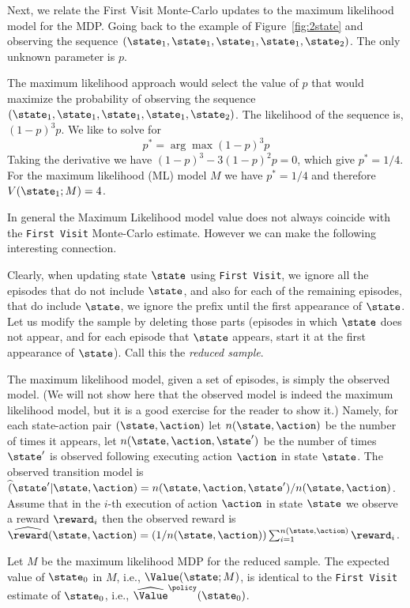 Next, we relate the First Visit Monte-Carlo updates to the maximum
likelihood model for the MDP. Going back to the example of
Figure~\ref{fig:2state} and observing the sequence
$(\state_1,\state_1,\state_1,\state_1,\state_2)$. The only unknown
parameter is $p$.

The maximum likelihood approach would select the value of $p$ that
would maximize the probability of observing the sequence
$(\state_1,\state_1,\state_1,\state_1,\state_2)$. The likelihood of
the sequence is, $(1-p)^3p$. We like to solve for
\[
p^* = \arg\max (1-p)^3 p
\]
Taking the derivative we have $(1-p)^3-3(1-p)^2p=0$, which give
$p^*=1/4$.
%
For the maximum likelihood (ML) model $M$ we have $p^*=1/4$ and
therefore $V(\state_1;M)=4$.

In general the Maximum Likelihood model value does not always
coincide with the {\tt First Visit} Monte-Carlo estimate. However we
can make the following interesting connection.

Clearly, when updating state $\state$ using {\tt First Visit}, we
ignore all the episodes that do not include $\state$, and also for
each of the remaining episodes, that do include $\state$, we ignore the
prefix until the first appearance of $\state$. Let us modify the
sample by deleting those parts (episodes in which $\state$ does not
appear, and for each episode that $\state$ appears, start it at the
first appearance of $\state$). Call this the {\em reduced sample}.

The maximum likelihood model, given a set of episodes, is simply the
observed model. (We will not show here that the observed model is
indeed the maximum likelihood model, but it is a good exercise for the reader to show it.) 
Namely, for each state-action
pair $(\state,\action)$ let $n(\state,\action)$ be the number of
times it appears, let $n(\state,\action,\state')$ be the number of
times $\state'$ is observed following executing action $\action$ in
state $\state$. The observed transition model is
$\widehat(\state'|\state,\action)=n(\state,\action,\state')/n(\state,\action)$.
Assume that in the $i$-th execution of action $\action$ in state
$\state$ we observe a reward $\reward_i$ then the observed reward is
$\widehat{\reward}(\state,\action)=(1/n(\state,\action))\sum_{i=1}^{n(\state,\action)}
\reward_i$.

\begin{theorem}
\label{thm:MC-ML}
%
Let $M$ be the maximum likelihood MDP for the reduced sample. The
expected value of $\state_0$ in $M$, i.e., $\Value(\state;M)$, is
identical to the {\tt First Visit} estimate of $\state_0$, i.e.,
$\widehat{\Value}^\policy(\state_0)$.
\end{theorem}

